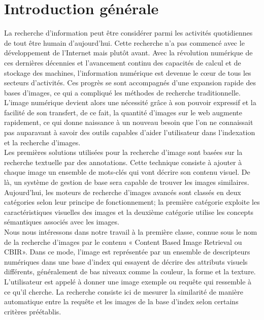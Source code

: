 

\chapter*{Introduction générale}
La recherche d'information peut être considérer parmi les activités quotidiennes de tout être humain d'aujourd'hui. Cette recherche n'a pas commencé avec le développement de l’Internet mais plutôt avant. Avec la révolution numérique de ces dernières décennies et l’avancement continu des capacités de calcul et de stockage des machines, l’information numérique est devenue le cœur de tous les secteurs d’activités. Ces progrès se sont accompagnés d’une expansion rapide des bases d'images, ce qui a compliqué les méthodes de recherche traditionnelle.\\

L'image numérique devient alors une nécessité grâce à son pouvoir expressif et la facilité de son transfert, de ce fait, la quantité d'images sur le web augmente rapidement, ce qui donne naissance à un nouveau besoin que l’on ne connaissait pas auparavant à savoir des outils capables d’aider l’utilisateur dans l’indexation et la recherche d’images.\\

Les premières solutions utilisées pour la recherche d’image sont basées sur la recherche textuelle par des annotations. Cette technique consiste à ajouter à chaque image un ensemble de mots-clés qui vont décrire son contenu visuel. De là, un système de gestion de base sera capable de trouver les images similaires.\\

Aujourd’hui, les moteurs de recherche d’images avancés sont classés en deux catégories selon leur principe de fonctionnement; la première catégorie exploite les caractéristiques visuelles des images et la deuxième catégorie utilise les concepts sémantiques associés avec les images.\\

Nous nous intéressons dans notre travail à la première classe, connue sous le nom de la recherche d’images par le contenu « Content Based Image Retrieval ou CBIR».
Dans ce mode, l’image est représentée par un ensemble de descripteurs
numériques dans une base d'index qui essayent de décrire des attributs visuels différents, généralement de bas niveaux comme la couleur, la forme et la texture. L’utilisateur est appelé à donner une image exemple ou requête qui ressemble à ce qu’il cherche. La recherche consiste ici de mesurer la similarité de manière automatique entre la requête et les images de la base d'index selon certains critères préétablis.\\

